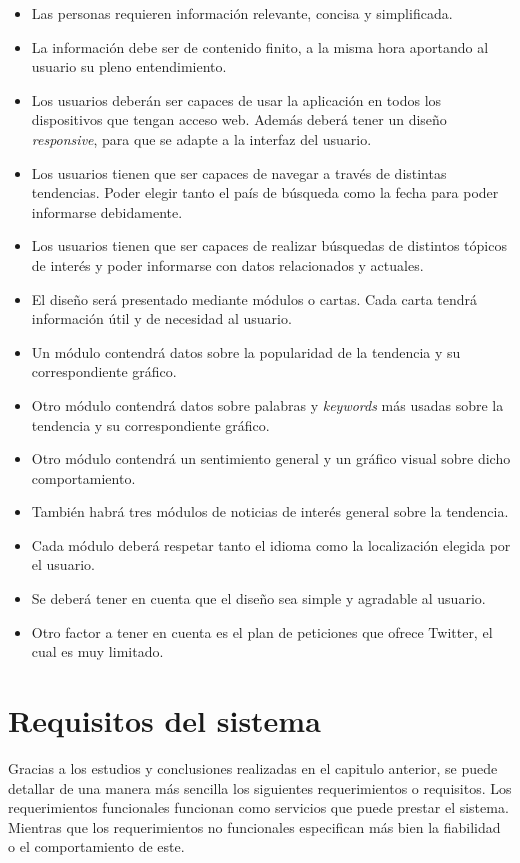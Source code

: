 \begin{itemize}
    \item
    Las personas requieren información relevante, concisa y simplificada.
    \item
    La información debe ser de contenido finito, a la misma hora aportando al usuario su pleno entendimiento.
    \item
    Los usuarios deberán ser capaces de usar la aplicación en todos los dispositivos que tengan acceso web. Además deberá tener un diseño \textit{responsive}, para que se adapte a la interfaz del usuario.
    \item
    Los usuarios tienen que ser capaces de navegar a través de distintas tendencias. Poder elegir tanto el país de búsqueda como la fecha para poder informarse debidamente.
    \item
    Los usuarios tienen que ser capaces de realizar búsquedas de distintos tópicos de interés y poder informarse con datos relacionados y actuales.
    \item
    El diseño será presentado mediante módulos o cartas. Cada carta tendrá información útil y de necesidad al usuario.
    \item
    Un módulo contendrá datos sobre la popularidad de la tendencia y su correspondiente gráfico.
    \item
    Otro módulo contendrá datos sobre palabras y \textit{keywords} más usadas sobre la tendencia y su correspondiente gráfico.
    \item
    Otro módulo contendrá un sentimiento general y un gráfico visual sobre dicho comportamiento.
    \item
    También habrá tres módulos de noticias de interés general sobre la tendencia.
    \item
    Cada módulo deberá respetar tanto el idioma como la localización elegida por el usuario.
    \item
    Se deberá tener en cuenta que el diseño sea simple y agradable al usuario.
    \item
    Otro factor a tener en cuenta es el plan de peticiones que ofrece Twitter, el cual es muy limitado.
\end{itemize}

\newpage

\section{Requisitos del sistema}
Gracias a los estudios y conclusiones realizadas en el capitulo anterior, se puede detallar de una manera más sencilla los siguientes requerimientos o requisitos. Los requerimientos funcionales funcionan como servicios que puede prestar el sistema. Mientras que los requerimientos no funcionales especifican más bien la fiabilidad o el comportamiento de este.

